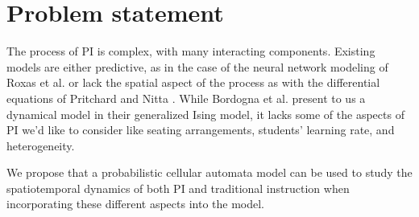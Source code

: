 \section{Problem statement}
The process of PI is complex, with many interacting components.
Existing models are either predictive, as in the case of the neural network modeling of Roxas et al. \cite{roxas2010seating} or lack the spatial aspect of the process as with the differential equations of Pritchard \cite{pritchard2008mathematical} and Nitta \cite{nitta2019mathematical}.
While Bordogna et al. \cite{bordogna2001theoretical,bordogna2003simulation} present to us a dynamical model in their generalized Ising model, it lacks some of the aspects of PI we'd like to consider like seating arrangements, students' learning rate, and heterogeneity.

We propose that a probabilistic cellular automata model can be used to study the spatiotemporal dynamics of both PI and traditional instruction when incorporating these different aspects into the model.

